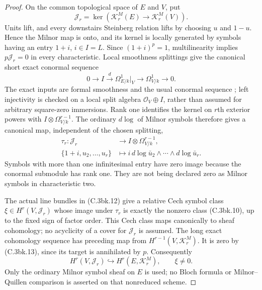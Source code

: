 \begin{proof}
On the common topological space of $E$ and $V$, put
\[
 \mathcal J_r=\ker(\mathcal K_r^M(E)\longrightarrow\mathcal K_r^M(V)).
\]
Units lift, and every downstairs Steinberg relation lifts by choosing
$u$ and $1-u$. Hence the Milnor map is onto, and its kernel is
locally generated by symbols having an entry $1+i$, $i\in I=L$.
Since $(1+i)^p=1$, multilinearity implies $p\mathcal J_r=0$ in
every characteristic. Local smoothness splittings give the canonical
short exact conormal sequence
\[
 0\longrightarrow I\xrightarrow d\Omega^1_{E/k}|_V
              \longrightarrow\Omega^1_{V/k}\longrightarrow0.
\]
The exact inputs are formal smoothness and the usual conormal sequence
\citep[Proposition 10.138.13 and Lemma 10.131.9]{frStacksFormalSmoothRelativeMilnor,D_StacksConormalUniformHigher};
left injectivity is checked on a local split algebra
$\mathcal O_V\oplus I$, rather than assumed for arbitrary
square-zero immersions. Rank one identifies the kernel on $r$th
exterior powers with $I\otimes\Omega^{r-1}_{V/k}$.
The ordinary $d\log$ of Milnor symbols therefore gives a canonical
map, independent of the chosen splitting,
\[
 \begin{aligned}
 \tau_r:\mathcal J_r&\longrightarrow I\otimes\Omega^{r-1}_{V/k},\\
 \{1+i,u_2,\ldots,u_r\}&\longmapsto
       i\,d\log\bar u_2\wedge\cdots\wedge d\log\bar u_r.
 \end{aligned}
 \tag{C.3bk.15}
\]
Symbols with more than one infinitesimal entry have zero image
because the conormal submodule has rank one. They are not being
declared zero as Milnor symbols in characteristic two.

The actual line bundles in (C.3bk.12) give a relative Cech symbol
class $\xi\in H^r(V,\mathcal J_r)$ whose image under $\tau_r$ is
exactly the nonzero class (C.3bk.10), up to the fixed sign of factor
order. This Cech class maps canonically to sheaf cohomology; no
acyclicity of a cover for $\mathcal J_r$ is assumed.
The long exact cohomology sequence has preceding map from
$H^{r-1}(V,\mathcal K_r^M)$. It is zero by (C.3bk.13), since its
target is annihilated by $p$. Consequently
\[
 H^r(V,\mathcal J_r)\hookrightarrow H^r(E,\mathcal K_r^M),
 \qquad \xi\ne0.
 \tag{C.3bk.16}
\]
Only the ordinary Milnor symbol sheaf on $E$ is used; no Bloch
formula or Milnor--Quillen comparison is asserted on that nonreduced
scheme.


\end{proof}
